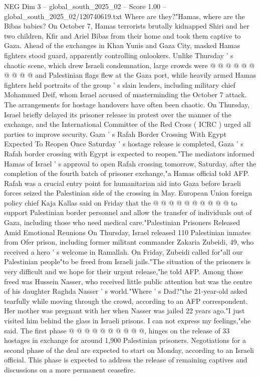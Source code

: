 \begin{textsample}{NEG Dim 3 – global\_south\_2025\_02 – Score 1.00 – global\_south\_2025\_02/120740619.txt}
Where are they?"Hamas, where are the Bibas babies?
On October 7, Hamas terrorists brutally kidnapped Shiri and her two children, Kfir and Ariel Bibas from their home and took them captive to Gaza.
Ahead of the exchanges in Khan Yunis and Gaza City, masked Hamas fighters stood guard, apparently controlling onlookers.
Unlike Thursday ' s chaotic scene, which drew Israeli condemnation, large crowds were @ @ @ @ @ @ @ @ @ @ and Palestinian flags flew at the Gaza port, while heavily armed Hamas fighters held portraits of the group ' s slain leaders, including military chief Mohammed Deif, whom Israel accused of masterminding the October 7 attack.
The arrangements for hostage handovers have often been chaotic.
On Thursday, Israel briefly delayed its prisoner release in protest over the manner of the exchange, and the International Committee of the Red Cross ( ICRC ) urged all parties to improve security.
Gaza ' s Rafah Border Crossing With Egypt Expected To Reopen Once Saturday ' s hostage release is completed, Gaza ' s Rafah border crossing with Egypt is expected to reopen."The mediators informed Hamas of Israel ' s approval to open Rafah crossing tomorrow, Saturday, after the completion of the fourth batch of prisoner exchange,"a Hamas official told AFP.
Rafah was a crucial entry point for humanitarian aid into Gaza before Israeli forces seized the Palestinian side of the crossing in May.
European Union foreign policy chief Kaja Kallas said on Friday that the @ @ @ @ @ @ @ @ @ @ to support Palestinian border personnel and allow the transfer of individuals out of Gaza, including those who need medical care."Palestinian Prisoners Released Amid Emotional Reunions On Thursday, Israel released 110 Palestinian inmates from Ofer prison, including former militant commander Zakaria Zubeidi, 49, who received a hero ' s welcome in Ramallah.
On Friday, Zubeidi called for"all our Palestinian people"to be freed from Israeli jails."The situation of the prisoners is very difficult and we hope for their urgent release,"he told AFP.
Among those freed was Hussein Nasser, who received little public attention but was the centre of his daughter Raghda Nasser ' s world."Where ' s Dad?"the 21-year-old asked tearfully while moving through the crowd, according to an AFP correspondent.
Her mother was pregnant with her when Nasser was jailed 22 years ago."I just visited him behind the glass in Israeli prisons.
I can not express my feelings,"she said.
The first phase @ @ @ @ @ @ @ @ @ @, hinges on the release of 33 hostages in exchange for around 1,900 Palestinian prisoners.
Negotiations for a second phase of the deal are expected to start on Monday, according to an Israeli official.
This phase is expected to address the release of remaining captives and discussions on a more permanent ceasefire.

\end{textsample}
